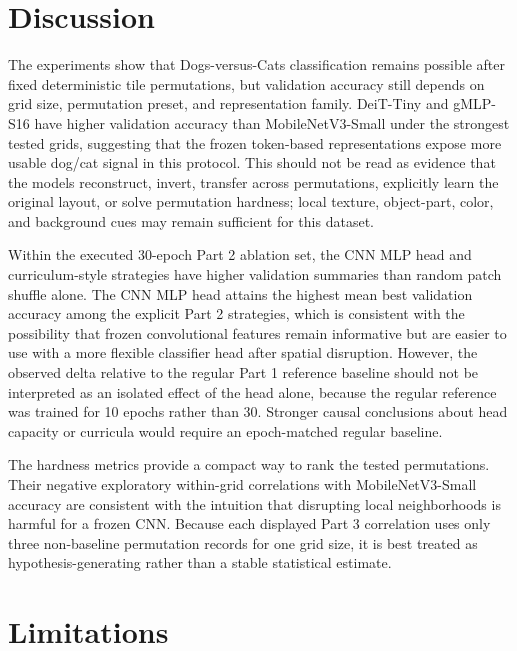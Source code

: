 \documentclass[12pt]{article}
\begin{document}
\clearpage

\section{Discussion}

The experiments show that Dogs-versus-Cats classification remains possible after fixed deterministic tile permutations, but validation accuracy still depends on grid size, permutation preset, and representation family. DeiT-Tiny and gMLP-S16 have higher validation accuracy than MobileNetV3-Small under the strongest tested grids, suggesting that the frozen token-based representations expose more usable dog/cat signal in this protocol. This should not be read as evidence that the models reconstruct, invert, transfer across permutations, explicitly learn the original layout, or solve permutation hardness; local texture, object-part, color, and background cues may remain sufficient for this dataset.

Within the executed 30-epoch Part 2 ablation set, the CNN MLP head and curriculum-style strategies have higher validation summaries than random patch shuffle alone. The CNN MLP head attains the highest mean best validation accuracy among the explicit Part 2 strategies, which is consistent with the possibility that frozen convolutional features remain informative but are easier to use with a more flexible classifier head after spatial disruption. However, the observed delta relative to the regular Part 1 reference baseline should not be interpreted as an isolated effect of the head alone, because the regular reference was trained for 10 epochs rather than 30. Stronger causal conclusions about head capacity or curricula would require an epoch-matched regular baseline.

The hardness metrics provide a compact way to rank the tested permutations. Their negative exploratory within-grid correlations with MobileNetV3-Small accuracy are consistent with the intuition that disrupting local neighborhoods is harmful for a frozen CNN. Because each displayed Part 3 correlation uses only three non-baseline permutation records for one grid size, it is best treated as hypothesis-generating rather than a stable statistical estimate.

\section{Limitations}
\end{document}
